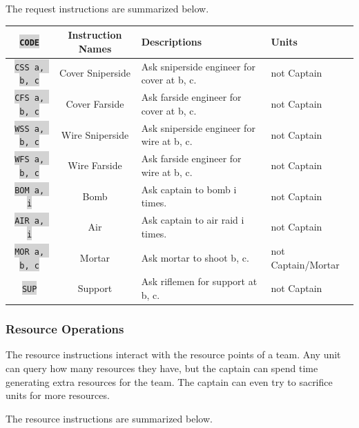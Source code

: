 \documentclass{article}
\newcommand{\vnscode}[1]{\colorbox{lightgray}{\lstinline[language=vns]{#1}}}
\begin{document}
The request instructions are summarized below.

\begin{minipage}{\textwidth}
\label{table:request}
\centering
\begin{tabular}{|c|c|l|l|}
    \hline \vnscode{CODE} & Instruction Names & Descriptions & Units \\ \hline
    \vnscode{CSS a, b, c} & Cover Sniperside & Ask sniperside engineer for cover at b, c. & not Captain \\ \hline
    \vnscode{CFS a, b, c} & Cover Farside & Ask farside engineer for cover at b, c. & not Captain \\ \hline
    \vnscode{WSS a, b, c} & Wire Sniperside & Ask sniperside engineer for wire at b, c. & not Captain \\ \hline
    \vnscode{WFS a, b, c} & Wire Farside & Ask farside engineer for wire at b, c. & not Captain \\ \hline
    \vnscode{BOM a, i} & Bomb & Ask captain to bomb i times. & not Captain \\ \hline
    \vnscode{AIR a, i} & Air & Ask captain to air raid i times. & not Captain \\ \hline
    \vnscode{MOR a, b, c} & Mortar & Ask mortar to shoot b, c. & not Captain/Mortar \\ \hline
    \vnscode{SUP} & Support & Ask riflemen for support at b, c. & not Captain \\ \hline
\end{tabular}
\end{minipage}

\subsubsection{Resource Operations} %

The resource instructions interact with the resource points of a team. Any unit
can query how many resources they have, but the captain can spend time
generating extra resources for the team. The captain can even try to sacrifice
units for more resources.

The resource instructions are summarized below.
\end{document}
